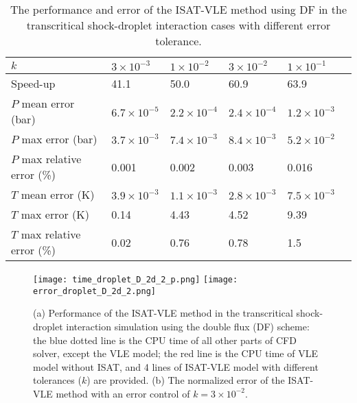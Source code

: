 \begin{table}%
\caption{The performance and error of the ISAT-VLE method using DF in the transcritical shock-droplet interaction cases with different error tolerance.}\label{droplet_DF_table}
\begin{tabular*}{0.8\textwidth}{@{} l|lllll@{} }
\toprule
$k$                        & $3\times 10^{-3}$   & $1\times 10^{-2}$    &$3\times 10^{-2}$    & $1\times 10^{-1}$\\
\midrule
Speed-up                   & 41.1                & 50.0                 & 60.9                & 63.9\\
$P$ mean error (bar)       & $6.7\times 10^{-5}$ & $2.2\times 10^{-4}$  & $2.4\times 10^{-4}$ & $1.2\times 10^{-3}$\\
$P$ max error (bar)        & $3.7\times 10^{-3}$ & $7.4\times 10^{-3}$  & $8.4\times 10^{-3}$ & $5.2\times 10^{-2}$ \\
$P$ max relative error (\%)& 0.001               & 0.002                & 0.003               & 0.016 \\
$T$ mean error (K)         & $3.9\times 10^{-3}$ & $1.1\times 10^{-3}$  & $2.8\times 10^{-3}$ & $7.5\times 10^{-3}$\\
$T$ max error (K)          & 0.14                & 4.43                 & 4.52                & 9.39\\
$T$ max relative error (\%)& 0.02                & 0.76                 & 0.78                & 1.5 \\
\bottomrule 
\end{tabular*}
\end{table}

\begin{figure}[htbp]
\centering
\texttt{[image: time\_droplet\_D\_2d\_2\_p.png]}
\texttt{[image: error\_droplet\_D\_2d\_2.png]}
\caption{(a) Performance of the ISAT-VLE method in the transcritical shock-droplet interaction simulation using the double flux (DF) scheme: the blue dotted line is the CPU time of all other parts of CFD solver, except the VLE model; the red line is the CPU time of VLE model without ISAT, and 4 lines of ISAT-VLE model with different tolerances ($k$) are provided. (b) The normalized error of the ISAT-VLE method with an error control of $k = 3 \times 10^{-2}$.}
\label{droplet_PE_D} 
\end{figure}

